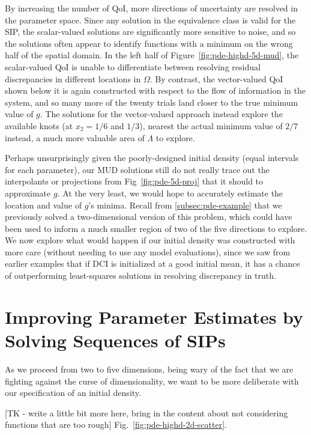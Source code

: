 By increasing the number of QoI, more directions of uncertainty are resolved in the parameter space.
Since any solution in the equivalence class is valid for the SIP, the scalar-valued solutions are significantly more sensitive to noise, and so the solutions often appear to identify functions with a minimum on the wrong half of the spatial domain.
In the left half of Figure~\ref{fig:pde-highd-5d-mud}, the scalar-valued QoI is unable to differentiate between resolving residual discrepancies in different locations in $\Omega$.
By contrast, the vector-valued QoI shown below it is again constructed with respect to the flow of information in the system, and so many more of the twenty trials land closer to the true minimum value of $g$.
The solutions for the vector-valued approach instead explore the available knots (at $x_2=1/6$ and $1/3$), nearest the actual minimum value of $2/7$ instead, a much more valuable area of $\Lambda$ to explore.

Perhaps unsurprisingly given the poorly-designed initial density (equal intervals for each parameter), our MUD solutions still do not really trace out the interpolants or projections from Fig~\ref{fig:pde-5d-proj} that it should to approximate $g$.
At the very least, we would hope to accurately estimate the location and value of $g$'s minima.
Recall from \ref{subsec:pde-example} that we previously solved a two-dimensional version of this problem, which could have been used to inform a much smaller region of two of the five directions to explore.
We now explore what would happen if our initial density was constructed with more care (without needing to use any model evaluations), since we saw from earlier examples that if DCI is initialized at a good initial mean, it has a chance of outperforming least-squares solutions in resolving discrepancy in truth.


\section{Improving Parameter Estimates by Solving Sequences of SIPs}

As we proceed from two to five dimensions, being wary of the fact that we are fighting against the curse of dimensionality, we want to be more deliberate with our specification of an initial density.

[TK - write a little bit more here, bring in the content about not considering functions that are too rough]
Fig.~\ref{fig:pde-highd-2d-scatter}.

